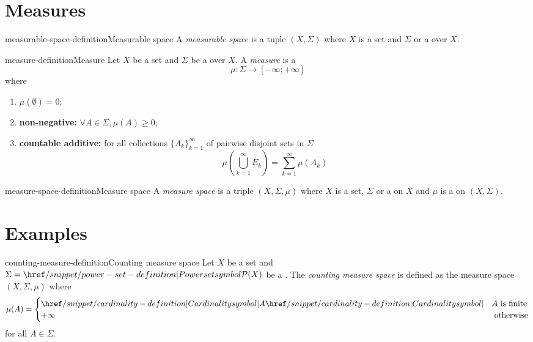 \documentclass[preview]{standalone}
\begin{document}
\genpage

\section{Measures}

\begin{snippetdefinition}{measurable-space-definition}{Measurable space}
    A \textit{measurable space} is a tuple \((X, \Sigma)\)
    where \(X\) is a set and \(\Sigma\) or a \sigmaalgebra over \(X\).
\end{snippetdefinition}

\begin{snippetdefinition}{measure-definition}{Measure}
    Let \(X\) be a set and \(\Sigma\) be a \sigmaalgebra over \(X\).
    A \textit{measure} is a \function
    \[
        \mu\colon \Sigma \to [-\infty; + \infty]
    \]
    where
    \begin{enumerate}
        \item \(\mu(\emptyset) = 0\);
        \item \textbf{non-negative:} \(\forall A \in \Sigma, \mu(A) \geq 0\);
        \item \textbf{countable additive:} for all \countable collections \({\{A_k\}}_{k=1}^\infty\)
        of pairwise disjoint sets in \(\Sigma\)
        \[
            \mu\left( \bigcup_{k=1}^\infty E_k \right)
            =
            \sum_{k=1}^\infty \mu(A_k)
        \]
    \end{enumerate}
\end{snippetdefinition}

\begin{snippetdefinition}{measure-space-definition}{Measure space}
    A \textit{measure space} is a triple \((X, \Sigma, \mu)\)
    where \(X\) is a set, \(\Sigma\) or a \sigmaalgebra on \(X\)
    and \(\mu\) is a \measure on \((X, \Sigma)\).
\end{snippetdefinition}

\section{Examples}

\begin{snippetdefinition}{counting-measure-definition}{Counting measure space}
    Let \(X\) be a set and \(\Sigma = \powerset(X)\) be a \sigmaalgebra.
    The \textit{counting measure space}
    is defined as the measure space \((X, \Sigma, \mu)\)
    where
    \[
        \mu(A) = \begin{cases}
            \cardinality{A} & A \text{ is finite} \\
            +\infty & \text{ otherwise}
        \end{cases}
    \]
    for all \(A \in \Sigma\).
\end{snippetdefinition}

\end{document}
